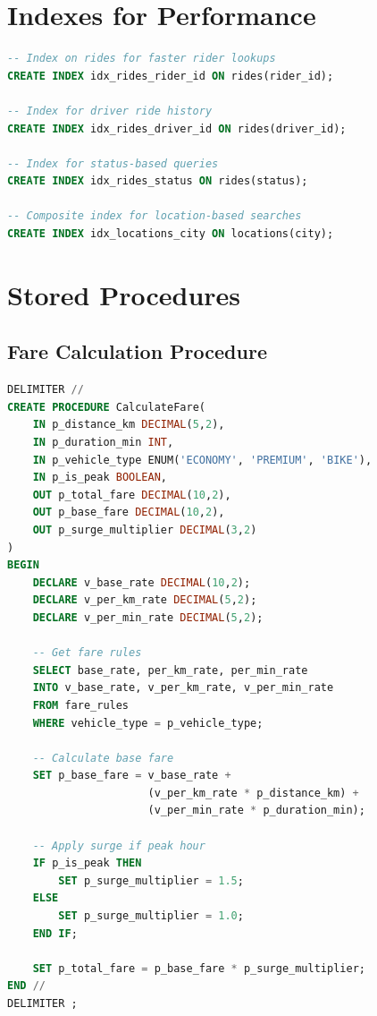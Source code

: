 \documentclass[12pt,a4paper]{report}
\begin{document}
\section{Indexes for Performance}

\begin{lstlisting}[language=SQL, caption={Performance optimization indexes}]
-- Index on rides for faster rider lookups
CREATE INDEX idx_rides_rider_id ON rides(rider_id);

-- Index for driver ride history
CREATE INDEX idx_rides_driver_id ON rides(driver_id);

-- Index for status-based queries
CREATE INDEX idx_rides_status ON rides(status);

-- Composite index for location-based searches
CREATE INDEX idx_locations_city ON locations(city);
\end{lstlisting}

\section{Stored Procedures}

\subsection{Fare Calculation Procedure}

\begin{lstlisting}[language=SQL, caption={CalculateFare procedure with surge pricing}]
DELIMITER //
CREATE PROCEDURE CalculateFare(
    IN p_distance_km DECIMAL(5,2),
    IN p_duration_min INT,
    IN p_vehicle_type ENUM('ECONOMY', 'PREMIUM', 'BIKE'),
    IN p_is_peak BOOLEAN,
    OUT p_total_fare DECIMAL(10,2),
    OUT p_base_fare DECIMAL(10,2),
    OUT p_surge_multiplier DECIMAL(3,2)
)
BEGIN
    DECLARE v_base_rate DECIMAL(10,2);
    DECLARE v_per_km_rate DECIMAL(5,2);
    DECLARE v_per_min_rate DECIMAL(5,2);
    
    -- Get fare rules
    SELECT base_rate, per_km_rate, per_min_rate
    INTO v_base_rate, v_per_km_rate, v_per_min_rate
    FROM fare_rules
    WHERE vehicle_type = p_vehicle_type;
    
    -- Calculate base fare
    SET p_base_fare = v_base_rate + 
                      (v_per_km_rate * p_distance_km) + 
                      (v_per_min_rate * p_duration_min);
    
    -- Apply surge if peak hour
    IF p_is_peak THEN
        SET p_surge_multiplier = 1.5;
    ELSE
        SET p_surge_multiplier = 1.0;
    END IF;
    
    SET p_total_fare = p_base_fare * p_surge_multiplier;
END //
DELIMITER ;
\end{lstlisting}
\end{document}
